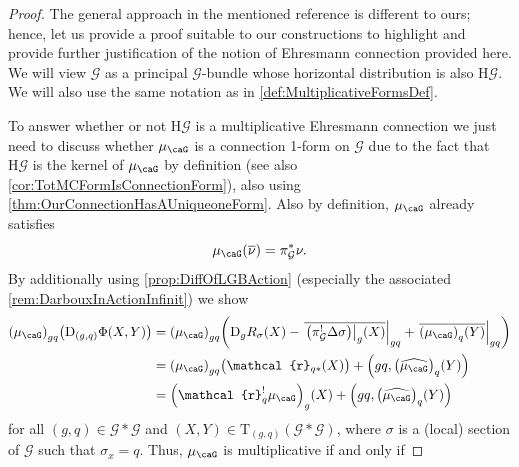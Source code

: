 \documentclass[reqno,a4paper,oneside]{amsart}
\newcommand\mutot{\mu_\caG}
\theoremstyle{plain}
\theoremstyle{remark}
\theoremstyle{definition}
\DeclareMathOperator{\sAd}{\mathKel{A\mkern-5.5mu d}}
\begin{document}
\begin{proof}
\leavevmode\newline
The general approach in the mentioned reference is different to ours; hence, let us provide a proof suitable to our constructions to highlight and provide further justification of the notion of Ehresmann connection provided here. We will view $\mathcal{G}$ as a principal $\mathcal{G}$-bundle whose horizontal distribution is also $\mathrm{H}\mathcal{G}$. We will also use the same notation as in \ref{def:MultiplicativeFormsDef}.

To answer whether or not $\mathrm{H}\mathcal{G}$ is a multiplicative Ehresmann connection we just need to discuss whether $\mutot$ is a connection 1-form on $\mathcal{G}$ due to the fact that $\mathrm{H}\mathcal{G}$ is the kernel of $\mutot$ by definition (see also \ref{cor:TotMCFormIsConnectionForm}), also using \ref{thm:OurConnectionHasAUniqueoneForm}. Also by definition, $\mutot$ already satisfies
\begin{equation*}
\mutot\mleft( \overline{\nu} \mright)
=
\pi_{\mathcal{G}}^*\nu.
\end{equation*}
By additionally using \ref{prop:DiffOfLGBAction} (especially the associated \ref{rem:DarbouxInActionInfinit}) we show
\begin{align*}
\mleft(\mutot\mright)_{gq}\mleft( \mathrm{D}_{(g,q)}\Phi(X, Y) \mright)
&=
\mleft(\mutot\mright)_{gq}\mleft(
	\mathrm{D}_gR_\sigma(X)
		- \mleft.{\overline{ \mleft.\mleft(\pi_{\mathcal{G}}^!\Delta \sigma\mright)\mright|_g (X)}}\mright|_{gq}
		+ \mleft.{\overline{\mleft( \mutot\mright)_{q} (Y)}}\mright|_{gq}
\mright)
\\
&=
\mleft(\mutot\mright)_{gq}\bigl(
	\mathcal{r}_{q*}(X)
\bigr)
		+ \mleft( gq, \mleft( \widehat{\mutot}\mright)_{q} (Y) \mright)
\\
&=
\mleft(\mathcal{r}_q^!\mutot\mright)_{g}(X)
		+ \mleft( gq, \mleft( \widehat{\mutot}\mright)_{q} (Y) \mright)
\end{align*} 
for all $(g, q) \in \mathcal{G}*\mathcal{G}$ and $(X, Y) \in \mathrm{T}_{(g, q)}(\mathcal{G}*\mathcal{G})$, where $\sigma$ is a (local) section of $\mathcal{G}$ such that $\sigma_{x} = q$. Thus, $\mutot$ is multiplicative if and only if

\end{proof}
\end{document}
